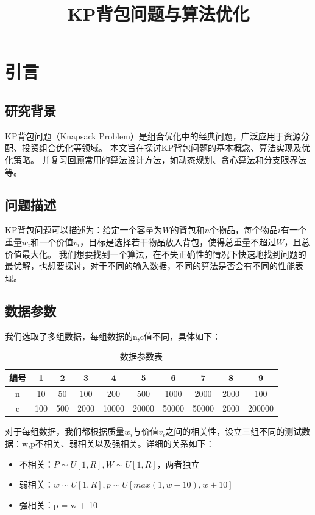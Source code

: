 \documentclass[openany]{book}
\title{KP背包问题与算法优化}
\begin{document}
\maketitle

\chapter{引言}
\section{研究背景}
KP背包问题（Knapsack Problem）是组合优化中的经典问题，广泛应用于资源分配、投资组合优化等领域。
本文旨在探讨KP背包问题的基本概念、算法实现及优化策略。
并复习回顾常用的算法设计方法，如动态规划、贪心算法和分支限界法等。

\section{问题描述}
KP背包问题可以描述为：给定一个容量为$W$的背包和$n$个物品，每个物品$i$有一个重量$w_i$和一个价值$v_i$，目标是选择若干物品放入背包，使得总重量不超过$W$，且总价值最大化。
我们想要找到一个算法，在不失正确性的情况下快速地找到问题的最优解，也想要探讨，对于不同的输入数据，不同的算法是否会有不同的性能表现。

\section{数据参数}
我们选取了多组数据，每组数据的n,c值不同，具体如下：
\begin{table}[H]
    \centering
    \begin{tabular}{|c|c|c|c|c|c|c|c|c|c|}
        \hline
        编号 & 1 & 2 & 3 & 4 & 5 & 6 & 7 & 8 & 9\\
        \hline
        n & 10 & 50 & 100 & 200 & 500 & 1000 & 2000 & 2000 & 100\\
        \hline
        c & 100 & 500 & 2000 & 10000 & 20000& 50000 & 50000 & 2000 & 200000\\
        \hline
    \end{tabular}
    \caption{数据参数表}
\end{table}
对于每组数据，我们都根据质量$w_i$与价值$v_i$之间的相关性，设立三组不同的测试数据：w,p不相关、弱相关以及强相关。详细的关系如下：
\begin{itemize}
    \item 不相关：$P \sim U[1,R],W \sim U[1,R]$，两者独立
    \item 弱相关：$w \sim U[1,R],p \sim U[max(1,w-10), w+10]$
    \item 强相关：p = w + 10
\end{itemize}
\end{document}
